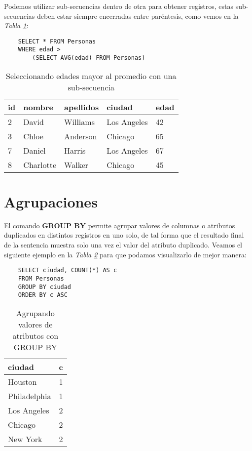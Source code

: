 Podemos utilizar sub-secuencias dentro de otra para obtener registros, estas sub-secuencias deben estar siempre encerradas entre paréntesis, como vemos en la \textit{Tabla \ref{tab: 17}}:
\begin{lstlisting}
    SELECT * FROM Personas
    WHERE edad >
        (SELECT AVG(edad) FROM Personas)
\end{lstlisting}
\begin{table}[H]
    \centering
    \caption{Seleccionando edades mayor al promedio con una sub-secuencia}
    \label{tab: 17}
    \begin{tabular}{|l|l|l|l|l|}
        \hline
        \textbf{id} & \textbf{nombre} & \textbf{apellidos} & \textbf{ciudad} & \textbf{edad} \\
        \hline
        2 & David       & Williams  & Los Angeles   & 42 \\
        \hline
        3 & Chloe       & Anderson  & Chicago       & 65 \\
        \hline
        7 & Daniel      & Harris    & Los Angeles   & 67 \\
        \hline
        8 & Charlotte   & Walker    & Chicago       & 45 \\
        \hline
    \end{tabular}
\end{table}



\section{Agrupaciones}

El comando \textbf{GROUP BY} permite agrupar valores de columnas o atributos duplicados en distintos registros en uno solo, de tal forma que el resultado final de la sentencia muestra solo una vez el valor del atributo duplicado. Veamos el siguiente ejemplo en la \textit{Tabla \ref{tab: 18}} para que podamos visualizarlo de mejor manera:
\begin{lstlisting}
    SELECT ciudad, COUNT(*) AS c
    FROM Personas
    GROUP BY ciudad
    ORDER BY c ASC
\end{lstlisting}
\begin{table}[H]
    \centering
    \caption{Agrupando valores de atributos con GROUP BY}
    \label{tab: 18}
    \begin{tabular}{|l|l|}
        \hline
        \textbf{ciudad} & \textbf{c} \\
        \hline
        Houston         & 1 \\
        \hline
        Philadelphia    & 1 \\
        \hline
        Los Angeles     & 2 \\
        \hline
        Chicago         & 2 \\
        \hline
        New York        & 2 \\
        \hline
    \end{tabular}
\end{table}

